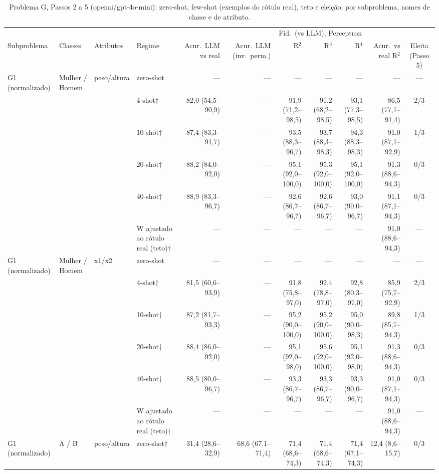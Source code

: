 \begin{table}[htbp]
\centering
\footnotesize
\caption{Problema G, Passos 2 a 5 (openai/gpt-4o-mini): zero-shot, few-shot (exemplos do rótulo real), teto e eleição, por subproblema, nomes de classe e de atributo.}
\label{tab:bloco3_G_passos_2_a_5_gpt4mini}
\begin{tabular}{llllrrrrrrc}
\toprule
 &  &  &  &  &  & \multicolumn{3}{c}{Fid.\ (vs LLM), Perceptron} &  &  \\ \cmidrule(lr){7-9}
Subproblema & Classes & Atributos & Regime & Acur.\ LLM vs real & Acur.\ LLM (inv.\ perm.) & R$^2$ & R$^3$ & R$^4$ & Acur.\ vs real R$^2$ & Eleita (Passo 5) \\
\midrule
G1 (normalizado) & Mulher / Homem & peso/altura & zero-shot & — & — & — & — & — & — & — \\
 &  &  & 4-shot† & 82,0 (54,5–90,9) & — & 91,9 (71,2–98,5) & 91,2 (68,2–98,5) & 93,1 (77,3–98,5) & 86,5 (77,1–91,4) & 2/3 \\
 &  &  & 10-shot† & 87,4 (83,3–91,7) & — & 93,5 (88,3–96,7) & 93,7 (88,3–98,3) & 94,3 (88,3–98,3) & 91,0 (87,1–92,9) & 1/3 \\
 &  &  & 20-shot† & 88,2 (84,0–92,0) & — & 95,1 (92,0–100,0) & 95,3 (92,0–100,0) & 95,1 (92,0–100,0) & 91,3 (88,6–94,3) & 0/3 \\
 &  &  & 40-shot† & 88,9 (83,3–96,7) & — & 92,6 (86,7–96,7) & 92,6 (86,7–96,7) & 93,0 (90,0–96,7) & 91,1 (87,1–94,3) & 0/3 \\
 &  &  & W ajustado ao rótulo real (teto)† & — & — & — & — & — & 91,0 (88,6–94,3) & — \\
\midrule
G1 (normalizado) & Mulher / Homem & x1/x2 & zero-shot & — & — & — & — & — & — & — \\
 &  &  & 4-shot† & 81,5 (60,6–93,9) & — & 91,8 (75,8–97,0) & 92,4 (78,8–97,0) & 92,8 (80,3–97,0) & 85,9 (75,7–92,9) & 2/3 \\
 &  &  & 10-shot† & 87,2 (81,7–93,3) & — & 95,2 (90,0–100,0) & 95,2 (90,0–100,0) & 95,0 (90,0–98,3) & 89,8 (85,7–94,3) & 1/3 \\
 &  &  & 20-shot† & 88,4 (86,0–92,0) & — & 95,1 (92,0–98,0) & 95,6 (92,0–100,0) & 95,1 (92,0–98,0) & 91,3 (88,6–94,3) & 0/3 \\
 &  &  & 40-shot† & 88,5 (80,0–96,7) & — & 93,3 (86,7–96,7) & 93,3 (86,7–96,7) & 93,3 (90,0–96,7) & 91,0 (87,1–94,3) & 0/3 \\
 &  &  & W ajustado ao rótulo real (teto)† & — & — & — & — & — & 91,0 (88,6–94,3) & — \\
\midrule
G1 (normalizado) & A / B & peso/altura & zero-shot† & 31,4 (28,6–32,9) & 68,6 (67,1–71,4) & 71,4 (68,6–74,3) & 71,4 (68,6–74,3) & 71,4 (67,1–74,3) & 12,4 (8,6–15,7) & 0/3 \\

\end{tabular}
\end{table}
